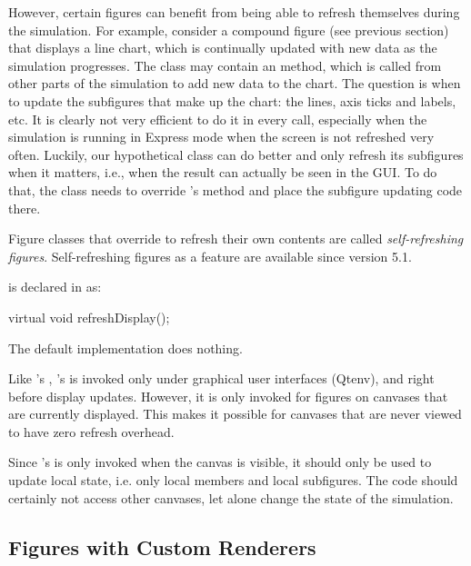 However, certain figures can benefit from being able to refresh themselves
during the simulation. For example, consider a compound figure (see
previous section) that displays a line chart, which is continually
updated with new data as the simulation progresses. The 
class may contain an  method, which is called
from other parts of the simulation to add new data to the chart.
The question is when to update the subfigures that make up the chart: the
lines, axis ticks and labels, etc. It is clearly not very efficient
to do it in every  call, especially when the
simulation is running in Express mode when the screen is not refreshed
very often. Luckily, our hypothetical  class
can do better and only refresh its subfigures when it matters, i.e.,
when the result can actually be seen in the GUI. To do that, the class
needs to override 's  method and
place the subfigure updating code there.

Figure classes that override  to refresh their
own contents are called \textit{self-refreshing figures}. Self-refreshing
figures as a feature are available since {\opp} version 5.1.

 is declared in  as:

\begin{cpp}
virtual void refreshDisplay();
\end{cpp}

The default implementation does nothing.

Like 's , 's
 is invoked only under graphical user interfaces
(Qtenv), and right before display updates. However, it is only invoked for
figures on canvases that are currently displayed. This makes it possible for
canvases that are never viewed to have zero refresh overhead.

Since 's  is only invoked when the
canvas is visible, it should only be used to update local state, i.e. only
local members and local subfigures. The code should certainly not access
other canvases, let alone change the state of the simulation.


\subsection{Figures with Custom Renderers}
\label{sec:graphics:figures-with-custom-renderers}

